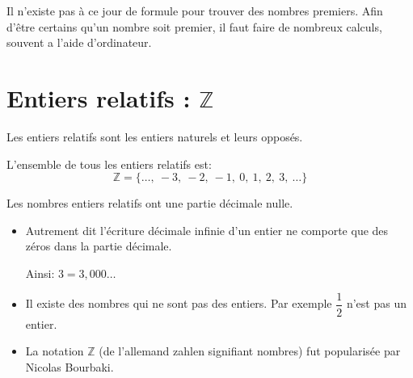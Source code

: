 \begin{rem}{}{}
Il n'existe pas à ce jour de formule pour trouver des nombres premiers. Afin d'être certains qu'un nombre soit premier, il faut faire de nombreux calculs, souvent a l'aide d'ordinateur.
\end{rem}

\newpage
\section{Entiers relatifs : $\mathbb{Z}$}

\begin{defi}{}{}
\noindent Les entiers relatifs sont les entiers naturels et leurs opposés.

\noindent L'ensemble de tous les entiers relatifs est:
$$\mathbb{Z}=\{ \dots ,\ -3,\ -2,\ -1,\ 0,\ 1,\ 2,\ 3,\ \dots \}$$
\end{defi}

\begin{prop}{}{}
Les nombres entiers relatifs ont une partie décimale nulle.
\end{prop}

\begin{rem}{}{}
\begin{itemize}
\item Autrement dit l'écriture décimale infinie d'un entier ne comporte que des zéros dans la partie décimale. 

Ainsi: $3=3,000\dots$
\item Il existe des nombres qui ne sont pas des entiers. Par exemple $\dfrac{1}{2}$ n'est pas un entier.
\item La notation $\mathbb{Z}$ (de l'allemand \og zahlen\fg{} signifiant nombres) fut popularisée par Nicolas Bourbaki.
\end{itemize}
\end{rem}




